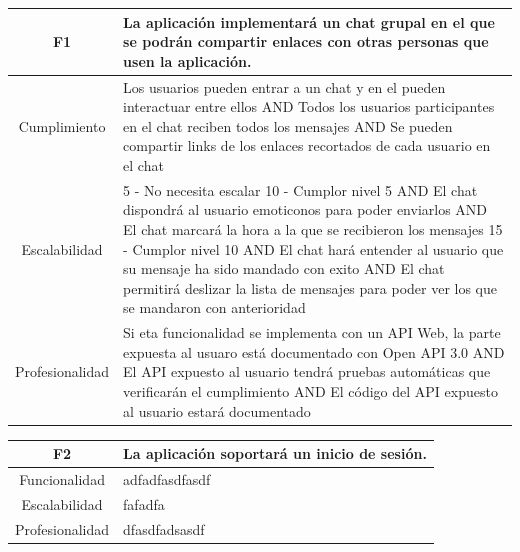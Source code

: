 \documentclass{article}
\begin{document}
\begin{table}[hbtp]
    \footnotesize
    \centering
    \settowidth{}
    \setlength\extrarowheight{5pt}
    \begin{tabulary}{\textwidth}{ C L }
        \textbf{F1} & La aplicación implementará un chat grupal en el que se podrán compartir enlaces con otras personas que usen la aplicación.
        \\
    \hline
    
    Cumplimiento & Los usuarios pueden entrar a un chat y en el pueden interactuar entre ellos AND Todos los usuarios participantes en el chat reciben todos los mensajes AND Se pueden compartir links de los enlaces recortados de cada usuario en el chat\\
        
    Escalabilidad & 5 - No necesita escalar
    10 - Cumplor nivel 5 AND El chat dispondrá al usuario emoticonos para poder enviarlos AND El chat marcará la hora a la que se recibieron los mensajes
    15 - Cumplor nivel 10 AND El chat hará entender al usuario que su mensaje ha sido mandado con exito AND El chat permitirá deslizar la lista de mensajes para poder ver los que se mandaron con anterioridad
    \\

    Profesionalidad & Si eta funcionalidad se implementa con un API Web, la parte expuesta al usuaro está documentado con Open API 3.0 AND El API expuesto al usuario tendrá pruebas automáticas que verificarán el cumplimiento AND El código del API expuesto al usuario estará documentado\\

    \end{tabulary}
\end{table}

\begin{table}[hbtp]
    \footnotesize
    \centering
    \settowidth{}
    \setlength\extrarowheight{5pt}
    \begin{tabulary}{\textwidth}{ C L }
        \textbf{F2} & La aplicación soportará un inicio de sesión.
        \\
    \hline
    
    Funcionalidad & adfadfasdfasdf\\
        
    Escalabilidad & fafadfa \\

    Profesionalidad & dfasdfadsasdf \\

    \end{tabulary}
\end{table}
\end{document}

